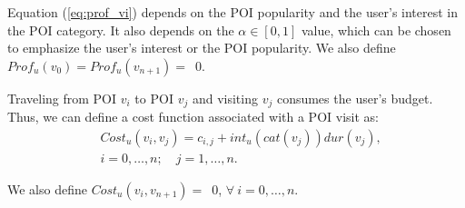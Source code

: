Equation (\ref{eq:prof_vi}) depends on the POI popularity and the user's interest in the POI category. It also depends on the $\alpha \in [0,1]$ value, which can be chosen to emphasize the user's interest or the POI popularity. We also define $Prof_{u}(v_0)=Prof_{u}(v_{n+1})=$~0.

Traveling from POI $v_i$ to POI $v_j$ and visiting $v_j$ consumes the user's budget. Thus, we can define a cost function associated with a POI visit as:
\begin{equation}
\label{eq:cost_vi}
\begin{split}
& Cost_{u}(v_i,v_j) = c_{i,j} + int_u(cat(v_j))dur(v_{j}), \\ 
& {i=0,\dots, n}; {\quad j=1,\dots,n}.
\end{split}
\end{equation}

We also define $Cost_{u}(v_i,v_{n+1})=$~0, $\forall \ i=0,\dots, n$.